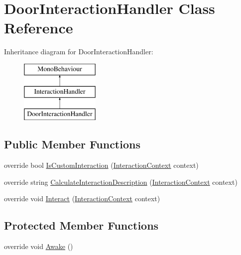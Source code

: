 \hypertarget{class_door_interaction_handler}{}\section{Door\+Interaction\+Handler Class Reference}
\label{class_door_interaction_handler}
Inheritance diagram for Door\+Interaction\+Handler\+:\begin{figure}[H]
\begin{center}
\leavevmode
\includegraphics[height=3.000000cm]{class_door_interaction_handler}
\end{center}
\end{figure}
\subsection*{Public Member Functions}
\begin{DoxyCompactItemize}
\item 
override bool \mbox{\hyperlink{class_door_interaction_handler_a2621737500ee61f39f1873cf2353831c}{Is\+Custom\+Interaction}} (\mbox{\hyperlink{class_interaction_context}{Interaction\+Context}} context)
\item 
override string \mbox{\hyperlink{class_door_interaction_handler_a946244bed82fef5c376529a64fcc9f06}{Calculate\+Interaction\+Description}} (\mbox{\hyperlink{class_interaction_context}{Interaction\+Context}} context)
\item 
override void \mbox{\hyperlink{class_door_interaction_handler_ab4099b8368bb7d8cb8e0d8ed0795e9b9}{Interact}} (\mbox{\hyperlink{class_interaction_context}{Interaction\+Context}} context)
\end{DoxyCompactItemize}
\subsection*{Protected Member Functions}
\begin{DoxyCompactItemize}
\item 
override void \mbox{\hyperlink{class_door_interaction_handler_ae1d36b6037ec736fed8b528e5125f1be}{Awake}} ()
\end{DoxyCompactItemize}


